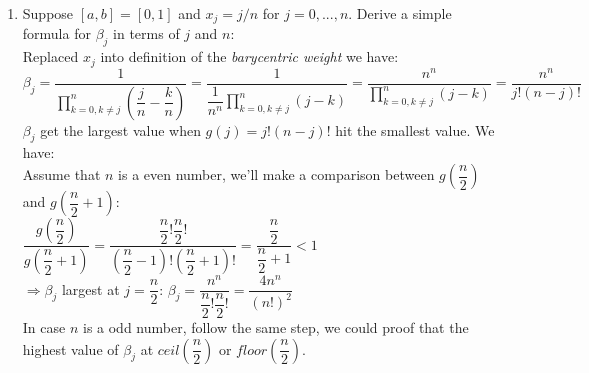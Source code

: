 \documentclass[14pt,a4paper]{article}
\begin{document}
\begin{enumerate}
		\item Suppose $[a,b] = [0,1]$ and $x_j = j/n$ for $j = 0, ..., n$. Derive a simple formula for $\beta_j$ in terms of $j$ and $n$: \\
		Replaced $x_j$ into definition of the \textit{barycentric weight} we have:\\
		$\beta_j = \dfrac{1}{\prod_{k=0,k \neq j}^{n}(\dfrac{j}{n}-\dfrac{k}{n})} = \dfrac{1}{\dfrac{1}{n^n}\prod_{k=0,k \neq j}^{n}(j-k)} =\dfrac{n^n}{\prod_{k=0,k \neq j}^{n}(j-k)}  = \dfrac{n^n}{j!(n-j)!}$ \\
	
		$\beta_j$ get the largest value when $g(j) = j!(n-j)!$ hit the smallest value. We have:\\
		Assume that $n$ is a even number, we'll make a comparison between $g(\dfrac{n}{2})$ and $g(\dfrac{n}{2}+1)$:\\
		\hspace*{2cm} $\dfrac{g(\dfrac{n}{2})}{g(\dfrac{n}{2}+1)} = \dfrac{\dfrac{n}{2}!\dfrac{n}{2}!}{(\dfrac{n}{2}-1)!(\dfrac{n}{2}+1)!} = \dfrac{\dfrac{n}{2}}{\dfrac{n}{2}+1} < 1$ \\
		$\Rightarrow \beta_j$ largest at $j =\dfrac{n}{2}$: $\beta_j = \dfrac{n^n}{\dfrac{n}{2}!\dfrac{n}{2}!} = \dfrac{4n^n}{(n!)^2} $ \\
		
		In case $n$ is a odd number, follow the same step, we could proof that the highest value of $\beta_j$ at $ceil(\dfrac{n}{2})$ or $floor(\dfrac{n}{2})$.
		
	\end{enumerate} 
	
\end{document}
